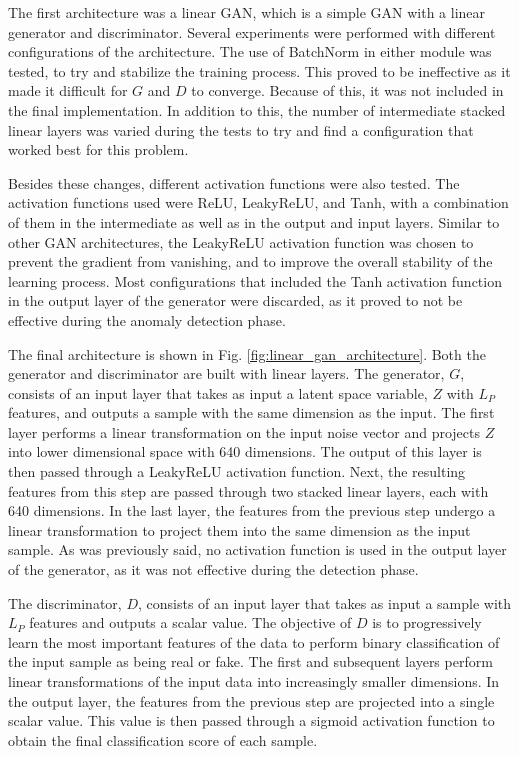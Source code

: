 The first architecture was a linear GAN, which is a simple GAN with a linear generator and discriminator. Several experiments were performed with different configurations of the architecture. The use of BatchNorm in either module was tested, to try and stabilize the training process. This proved to be ineffective as it made it difficult for $G$ and $D$ to converge. Because of this, it was not included in the final implementation. In addition to this, the number of intermediate stacked linear layers was varied during the tests to try and find a configuration that worked best for this problem. 

Besides these changes, different activation functions were also tested. The activation functions used were ReLU, LeakyReLU, and Tanh, with a combination of them in the intermediate as well as in the output and input layers. Similar to other GAN architectures, the LeakyReLU activation function was chosen to prevent the gradient from vanishing, and to improve the overall stability of the learning process. Most configurations that included the Tanh activation function in the output layer of the generator were discarded, as it proved to not be effective during the anomaly detection phase.

The final architecture is shown in Fig. \ref{fig:linear_gan_architecture}. Both the generator and discriminator are built with linear layers. The generator, $G$, consists of an input layer that takes as input a latent space variable, $Z$ with $L_P$ features, and outputs a sample with the same dimension as the input. The first layer performs a linear transformation on the input noise vector and projects $Z$ into lower dimensional space with 640 dimensions. The output of this layer is then passed through a LeakyReLU activation function. Next, the resulting features from this step are passed through two stacked linear layers, each with 640 dimensions. In the last layer, the features from the previous step undergo a linear transformation to project them into the same dimension as the input sample. As was previously said, no activation function is used in the output layer of the generator, as it was not effective during the detection phase.

The discriminator, $D$, consists of an input layer that takes as input a sample with $L_P$ features and outputs a scalar value. The objective of $D$ is to progressively learn the most important features of the data to perform binary classification of the input sample as being real or fake. The first and subsequent layers perform linear transformations of the input data into increasingly smaller dimensions. In the output layer, the features from the previous step are projected into a single scalar value. This value is then passed through a sigmoid activation function to obtain the final classification score of each sample.


